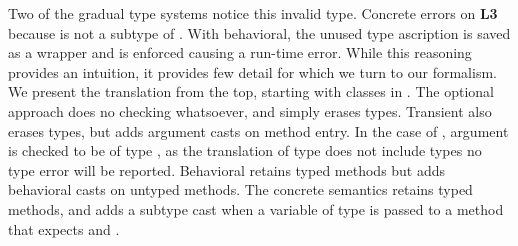 \documentclass[USenglish]{tex/lipics-v2016}f
\begin{document}
Two of the gradual type systems notice this invalid type. Concrete errors on
{\bf L3} because \E is not a subtype of \C.  With behavioral, the unused
type ascription is saved as a wrapper and is enforced causing a run-time error.
While this reasoning provides an intuition, it provides few detail for which
we turn to our formalism.  We present the translation from the top, starting
with classes in .  The optional approach does no
checking whatsoever, and simply erases types. Transient also erases types,
but adds argument casts on method entry. In the case of \m, argument \x is
checked to be of type \E, as the translation of type \E does not include
types no type error will be reported.  Behavioral retains typed methods but
adds behavioral casts on untyped methods.  The concrete semantics retains
typed methods, and adds a subtype cast when a variable of type \any is passed
to a method that expects and \E.
\end{document}
